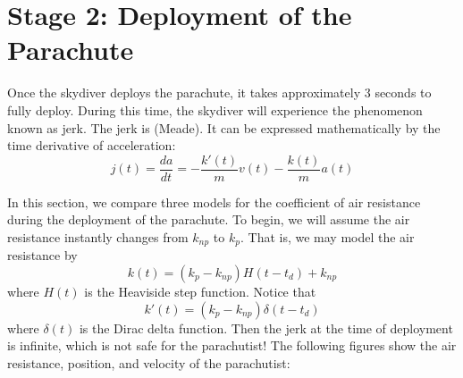 \documentclass{article}
\begin{document}
    \section*{Stage 2: Deployment of the Parachute}
    Once the skydiver deploys the parachute, it takes approximately 3 seconds to fully deploy. During this time, the skydiver will experience the phenomenon known as jerk. The jerk is  (Meade). It can be expressed mathematically by the time derivative of acceleration:
    \begin{equation}
        j(t) = \frac{da}{dt} = -\frac{k'(t)}{m}v(t) - \frac{k(t)}{m}a(t)
    \end{equation}
    
    In this section, we compare three models for the coefficient of air resistance during the deployment of the parachute. To begin, we will assume the air resistance instantly changes from $k_{np}$ to $k_p$. That is, we may model the air resistance by
    \[k(t) = (k_p - k_{np})H(t - t_d) + k_{np}\]
    where $H(t)$ is the Heaviside step function. Notice that 
    \[k'(t) = (k_p - k_{np})\delta(t - t_d)\]
    where $\delta(t)$ is the Dirac delta function. Then the jerk at the time of deployment is infinite, which is not safe for the parachutist! The following figures show the air resistance, position, and velocity of the parachutist:
\end{document}

